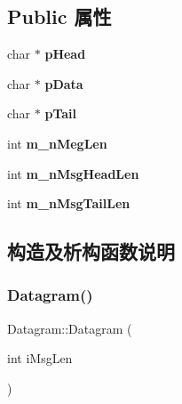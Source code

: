 \subsection*{Public 属性}
\begin{DoxyCompactItemize}
\item 
\mbox{\label{class_datagram_ac71eedd18cac5107f545043abd2d2655}} 
char $\ast$ {\bfseries p\+Head}
\item 
\mbox{\label{class_datagram_a50bba5269b8d107e9be3147f28a9229c}} 
char $\ast$ {\bfseries p\+Data}
\item 
\mbox{\label{class_datagram_af4d0826f99eb27b443a48ddc21e6815f}} 
char $\ast$ {\bfseries p\+Tail}
\item 
\mbox{\label{class_datagram_aab7f89c5363d398b03ae8f8709e3e8c6}} 
int {\bfseries m\+\_\+n\+Meg\+Len}
\item 
\mbox{\label{class_datagram_afeb0a8abee7a260fc81f2cdf8978e0b2}} 
int {\bfseries m\+\_\+n\+Msg\+Head\+Len}
\item 
\mbox{\label{class_datagram_aaa9c1b32f5fb0414778af41cc01a6b9f}} 
int {\bfseries m\+\_\+n\+Msg\+Tail\+Len}
\end{DoxyCompactItemize}


\subsection{构造及析构函数说明}
\mbox{\label{class_datagram_a4f1b9ef3e5a00a11e9b206665c5968dd}} 
\subsubsection{\texorpdfstring{Datagram()}{Datagram()}}
{\footnotesize\ttfamily Datagram\+::\+Datagram (\begin{DoxyParamCaption}\item[{int}]{i\+Msg\+Len }\end{DoxyParamCaption})\hspace{0.3cm}{\ttfamily [inline]}}



